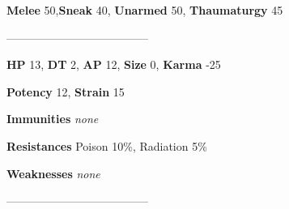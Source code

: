 \documentclass[11pt,a4paper,twocolumn]{book}
\begin{document}
\noindent
\textbf{Melee} 50,\textbf{Sneak} 40, \textbf{Unarmed} 50, \textbf{Thaumaturgy} 45	 

--------------------------------------

\noindent
\textbf{HP} 13, \textbf{DT} 2, \textbf{AP} 12, \textbf{Size} 0, \textbf{Karma} -25

\noindent
\textbf{Potency} 12, \textbf{Strain} 15

\noindent
\textbf{Immunities} \emph{none} %

\noindent
\textbf{Resistances} Poison 10\%, Radiation 5\%%

\noindent
\textbf{Weaknesses} \emph{none}%

--------------------------------------	
	
\end{document}
